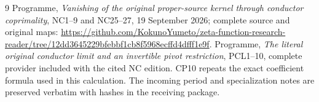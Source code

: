 \documentclass[11pt]{article}
\begin{document}
\begin{thebibliography}{9}
 Programme, \emph{Vanishing of the original proper-source
kernel through conductor coprimality}, NC1--9 and NC25--27,
19 September 2026; complete source and original maps:
\url{https://github.com/KokunoYumeto/zeta-function-research-reader/tree/12dd3645229bfebbf1cb8f5968ecffd4dfff1e9f}.
 Programme, \emph{The literal original conductor limit
and an invertible pivot restriction}, PCL1--10, complete provider
included with the cited NC edition. CP10 repeats the exact coefficient
formula used in this calculation. The incoming period and specialization
notes are preserved verbatim with hashes in the receiving package.
\end{thebibliography}
\end{document}
